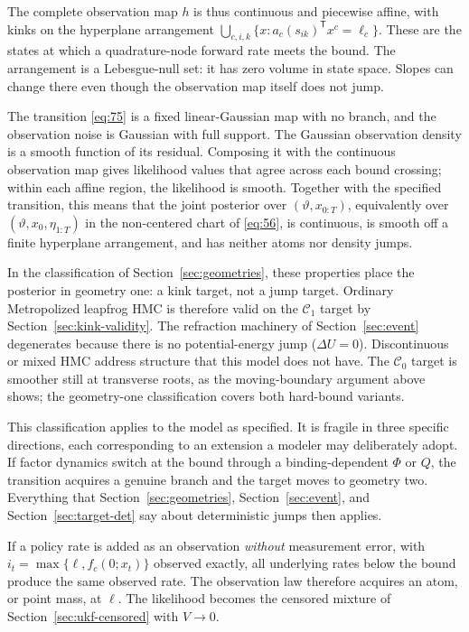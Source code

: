 \documentclass[11pt]{article}
\begin{document}
The complete observation map \(h\) is thus continuous and piecewise affine, with kinks on the hyperplane arrangement \(\bigcup_{c,i,k}\{x:a_c(s_{ik})^{\mathsf T}x^c=\ell_c\}\). These are the states at which a quadrature-node forward rate meets the bound. The arrangement is a Lebesgue-null set: it has zero volume in state space. Slopes can change there even though the observation map itself does not jump.

The transition \eqref{eq:75} is a fixed linear-Gaussian map with no branch, and the observation noise is Gaussian with full support. The Gaussian observation density is a smooth function of its residual. Composing it with the continuous observation map gives likelihood values that agree across each bound crossing; within each affine region, the likelihood is smooth. Together with the specified transition, this means that the joint posterior over \((\vartheta,x_{0:T})\), equivalently over \((\vartheta,x_0,\eta_{1:T})\) in the non-centered chart of \eqref{eq:56}, is continuous, is smooth off a finite hyperplane arrangement, and has neither atoms nor density jumps.

In the classification of Section~\ref{sec:geometries}, these properties place the posterior in geometry one: a kink target, not a jump target. Ordinary Metropolized leapfrog HMC is therefore valid on the \(\mathcal C_1\) target by Section~\ref{sec:kink-validity}. The refraction machinery of Section~\ref{sec:event} degenerates because there is no potential-energy jump (\(\Delta U=0\)). Discontinuous or mixed HMC address structure that this model does not have. The \(\mathcal C_0\) target is smoother still at transverse roots, as the moving-boundary argument above shows; the geometry-one classification covers both hard-bound variants.

This classification applies to the model as specified. It is fragile in three specific directions, each corresponding to an extension a modeler may deliberately adopt. If factor dynamics switch at the bound through a binding-dependent \(\Phi\) or \(Q\), the transition acquires a genuine branch and the target moves to geometry two. Everything that Section~\ref{sec:geometries}, Section~\ref{sec:event}, and Section~\ref{sec:target-det} say about deterministic jumps then applies.

If a policy rate is added as an observation \emph{without} measurement error, with \(i_t=\max\{\ell,f_c(0;x_t)\}\) observed exactly, all underlying rates below the bound produce the same observed rate. The observation law therefore acquires an atom, or point mass, at \(\ell\). The likelihood becomes the censored mixture of Section~\ref{sec:ukf-censored} with \(V\to0\).
\end{document}
